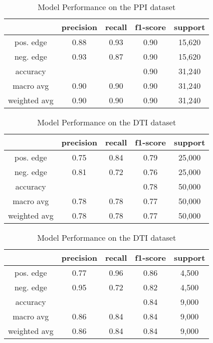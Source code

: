 \begin{table}[H]
{{}
\parbox{\linewidth}{
\centering
\begin{tabular}{|c|c|c|c|c|}
\hline
 & precision & recall & f1-score & support \\ [0.5ex]
\hline\hline
pos. edge & 0.88 & 0.93 & 0.90 & 15,620  \\
neg. edge & 0.93 & 0.87 & 0.90 & 15,620 \\
\hline\hline
accuracy & & & 0.90 & 31,240 \\
macro avg & 0.90 & 0.90 & 0.90 & 31,240 \\
weighted avg & 0.90 & 0.90 & 0.90 & 31,240 \\ [0.5ex]
\hline
\end{tabular}
\caption{Model Performance on the PPI dataset}
\label{tab:PPI_PRF}
}}
\end{table}
\begin{table}[H]
\setlength{\tabcolsep}{5pt}
\parbox{.5\linewidth}{
\centering
\begin{tabular}{|c|c|c|c|c|}
\hline
 & precision & recall & f1-score & support \\ [0.5ex]
\hline\hline
pos. edge & 0.75 & 0.84 & 0.79 & 25,000  \\
neg. edge & 0.81 & 0.72 & 0.76 & 25,000 \\
\hline\hline
accuracy & & & 0.78 & 50,000 \\
macro avg & 0.78 & 0.78 & 0.77 & 50,000 \\
weighted avg & 0.78 & 0.78 & 0.77 & 50,000 \\ [0.5ex]
\hline
\end{tabular}
\caption{Model Performance on the DDI dataset}
\label{tab:DDI_PRF}
}
\hfill
\parbox{.5\linewidth}{
\centering
\begin{tabular}{|c|c|c|c|c|}
\hline
 & precision & recall & f1-score & support \\ [0.5ex]
\hline\hline
pos. edge & 0.77 & 0.96 & 0.86 & 4,500  \\
neg. edge & 0.95 & 0.72 & 0.82 & 4,500 \\
\hline\hline
accuracy & & & 0.84 & 9,000 \\
macro avg & 0.86 & 0.84 & 0.84 & 9,000 \\
weighted avg & 0.86 & 0.84 & 0.84 & 9,000 \\ [0.5ex]
\hline
\end{tabular}
\caption{Model Performance on the DTI dataset}
\label{tab:DTI_PRF}
}
\end{table}